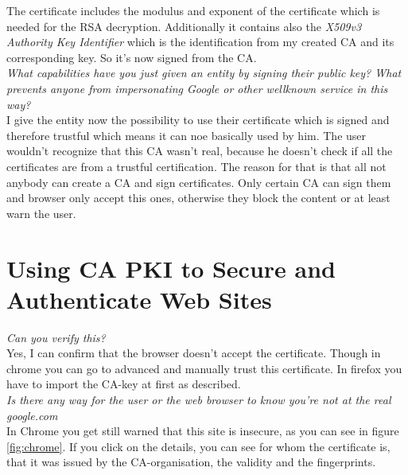 The certificate includes the modulus and exponent of the certificate which is needed for the RSA decryption. Additionally it contains also the \textit{X509v3 Authority Key Identifier} which is the identification from my created CA and its corresponding key. So it's now signed from the CA.\\

\textit{What capabilities have you just given an entity by signing their public key? What prevents anyone from impersonating Google or other wellknown service in this way?}\\

I give the entity now the possibility to use their certificate which is signed and therefore trustful which means it can noe basically used by him. The user wouldn't recognize that this CA wasn't real, because he doesn't check if all the certificates are from a trustful certification. The reason for that is that all not anybody can create a CA and sign certificates. Only certain CA can sign them and browser only accept this ones, otherwise they block the content or at least warn the user.


\section{Using CA PKI to Secure and Authenticate Web Sites} \label{t2}
\textit{Can you verify this?}\\
Yes, I can confirm that the browser doesn't accept the certificate. Though in chrome you can go to advanced and manually trust this certificate. In firefox you have to import the CA-key at first as described.\\

\textit{Is there any way for the user or the web browser to know you're not at the real google.com}\\

In Chrome you get still warned that this site is insecure, as you can see in figure \ref{fig:chrome}. If you click on the details, you can see for whom the certificate is, that it was issued by the CA-organisation, the validity and the fingerprints.

